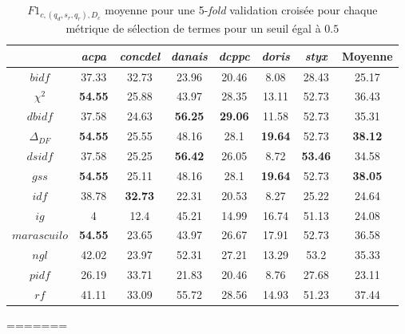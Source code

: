\begin{table}[!htb]
	\centering \scriptsize
	\begin{tabular}{|c|c|c|c|c|c|c|c|}
		\hline
		& \textit{acpa} & \textit{concdel} & \textit{danais} & \textit{dcppc} & \textit{doris} & \textit{styx} & \textbf{Moyenne} \\ \hline
		$bidf$ & 37.33 & 32.73 & 23.96 & 20.46 & 8.08 & 28.43 & 25.17 \\ \hline
		$\chi^2$ & \textbf{54.55} & 25.88 & 43.97 & 28.35 & 13.11 & 52.73 & 36.43 \\ \hline
		$dbidf$ & 37.58 & 24.63 & \textbf{56.25} & \textbf{29.06} & 11.58 & 52.73 & 35.31 \\ \hline
		$\Delta_{DF}$ & \textbf{54.55} & 25.55 & 48.16 & 28.1 & \textbf{19.64} & 52.73 & \textbf{38.12} \\ \hline
		$dsidf$ & 37.58 & 25.25 & \textbf{56.42} & 26.05 & 8.72 & \textbf{53.46} & 34.58 \\ \hline
		$gss$ & \textbf{54.55} & 25.11 & 48.16 & 28.1 & \textbf{19.64} & 52.73 & \textbf{38.05} \\ \hline
		$idf$ & 38.78 & \textbf{32.73} & 22.31 & 20.53 & 8.27 & 25.22 & 24.64 \\ \hline
		$ig$ & 4 & 12.4 & 45.21 & 14.99 & 16.74 & 51.13 & 24.08 \\ \hline
		$marascuilo$ & \textbf{54.55} & 23.65 & 43.97 & 26.67 & 17.91 & 52.73 & 36.58 \\ \hline
		$ngl$ & 42.02 & 23.97 & 52.31 & 27.21 & 13.29 & 53.2 & 35.33 \\ \hline
		$pidf$ & 26.19 & 33.71 & 21.83 & 20.46 & 8.76 & 27.68 & 23.11 \\ \hline
		$rf$ & 41.11 & 33.09 & 55.72 & 28.56 & 14.93 & 51.23 & 37.44 \\ \hline
	\end{tabular}
\caption{$F1_{c,(q_d, s_r, q_r), D_c}$ moyenne pour une 5-\textit{fold} validation croisée pour chaque métrique de sélection de termes pour un seuil égal à $0.5$} \label{tab:quanta:compareGW}
\end{table}
=======
%
